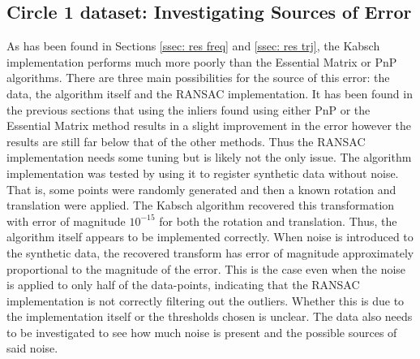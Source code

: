 \documentclass[12pt,a4paper]{article}
\begin{document}
  \subsection{Circle 1 dataset: Investigating Sources of Error}
    \label{ssec: res kabsch}
    As has been found in Sections \ref{ssec: res freq} and \ref{ssec: res trj}, the Kabsch implementation performs much more poorly than the Essential Matrix or PnP algorithms. There are three main possibilities for the source of this error: the data, the algorithm itself and the RANSAC implementation. It has been found in the previous sections that using the inliers found using either PnP or the Essential Matrix method results in a slight improvement in the error however the results are still far below that of the other methods. Thus the RANSAC implementation needs some tuning but is likely not the only issue. The algorithm implementation was tested by using it to register synthetic data without noise. That is, some points were randomly generated and then a known rotation and translation were applied. The Kabsch algorithm recovered this transformation with error of magnitude $10^{-15}$ for both the rotation and translation. Thus, the algorithm itself appears to be implemented correctly. When noise is introduced to the synthetic data, the recovered transform has error of magnitude approximately proportional to the magnitude of the error. This is the case even when the noise is applied to only half of the data-points, indicating that the RANSAC implementation is not correctly filtering out the outliers. Whether this is due to the implementation itself or the thresholds chosen is unclear. The data also needs to be investigated to see how much noise is present and the possible sources of said noise.
\end{document}
